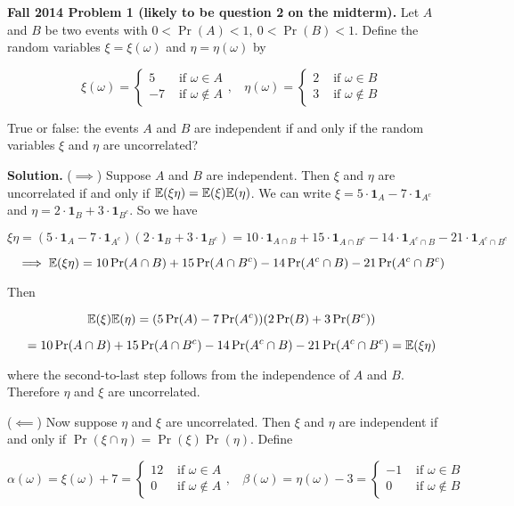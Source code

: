 \textbf{Fall 2014 Problem 1 (likely to be question 2 on the midterm).} Let \(A\) and \(B\) be two events with \(0 < \Pr(A) < 1, \ 0 < \Pr(B) < 1\). Define the random variables \(\xi = \xi(\omega)\) and \(\eta = \eta(\omega)\) by

\[
\xi(\omega) = \begin{cases} 
      5 & \text{ if } \omega \in A \\
      -7 &  \text{ if } \omega \notin A 
   \end{cases}, \ \ \ \ \eta(\omega) = \begin{cases} 
      2 & \text{ if } \omega \in B \\
      3 &  \text{ if } \omega \notin B 
   \end{cases}
\]

True or false: the events \(A\) and \(B\) are independent if and only if the random variables \(\xi\) and \(\eta\) are uncorrelated?

\textbf{Solution.} (\(\implies\)) Suppose \(A\) and \(B\) are independent. Then \(\xi\) and \(\eta\) are uncorrelated if and only if \(\E(\xi \eta ) = \E(\xi) \E(\eta)\). We can write \(\xi = 5 \cdot \boldsymbol{1}_A - 7 \cdot \boldsymbol{1}_{A^c}\) and \(\eta = 2 \cdot \boldsymbol{1}_B + 3 \cdot \boldsymbol{1}_{B^c}\). So we have

\[
\xi \eta = (5 \cdot \boldsymbol{1}_A - 7 \cdot \boldsymbol{1}_{A^c})(2 \cdot \boldsymbol{1}_B + 3 \cdot \boldsymbol{1}_{B^c}) = 10 \cdot \boldsymbol{1}_{A \cap B} +15 \cdot \boldsymbol{1}_{A \cap B^c} - 14 \cdot \boldsymbol{1}_{A^c \cap B} - 21 \cdot \boldsymbol{1}_{A^c \cap B^c}
\]

\[
\implies \E(\xi \eta ) = 10 \Pr(A \cap B) +15\Pr(A \cap B^c) - 14 \Pr(A^c \cap B) - 21\Pr(A^c \cap B^c)
\]

Then

\[
\E(\xi) \E(\eta) = (5 \Pr(A) - 7 \Pr(A^c))(2 \Pr(B) + 3 \Pr(B^c)) 
\]

\[
= 10\Pr(A \cap B) + 15 \Pr(A \cap B^c) - 14 \Pr(A^c \cap B) - 21 \Pr(A^c \cap B^c) = \E(\xi \eta )
\]

where the second-to-last step follows from the independence of \(A\) and \(B\). Therefore \(\eta\) and \(\xi\) are uncorrelated.

(\(\impliedby\)) Now suppose \(\eta\) and \(\xi\) are uncorrelated. Then \(\xi\) and \(\eta\) are independent if and only if \(\Pr(\xi \cap \eta) = \Pr(\xi) \Pr(\eta)\). Define

\[
\alpha(\omega) =  \xi(\omega) + 7 = \begin{cases} 
      12 & \text{ if } \omega \in A \\
      0 &  \text{ if } \omega \notin A 
   \end{cases}, \ \ \ \ \beta(\omega) =  \eta(\omega) - 3 = \begin{cases} 
      -1 & \text{ if } \omega \in B \\
      0 &  \text{ if } \omega \notin B 
   \end{cases}
\]

